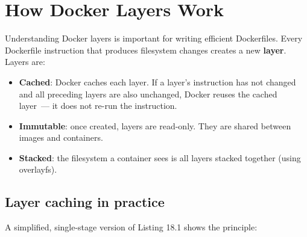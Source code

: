 \setcounter{section}{3}
\section{How Docker Layers Work}\label{18-containerization:184-how-docker-layers-work}

Understanding Docker layers is important for writing efficient Dockerfiles. Every Dockerfile instruction that produces filesystem changes creates a new \textbf{layer}. Layers are:

\begin{itemize}
\tightlist
\item
  \textbf{Cached}: Docker caches each layer. If a layer's instruction has not changed and all preceding layers are also unchanged, Docker reuses the cached layer~--- it does not re-run the instruction.
\item
  \textbf{Immutable}: once created, layers are read-only. They are shared between images and containers.
\item
  \textbf{Stacked}: the filesystem a container sees is all layers stacked together (using overlayfs).
\end{itemize}

\subsection*{Layer caching in practice}\label{18-containerization:layer-caching-in-practice}

A simplified, single-stage version of Listing 18.1 shows the principle:

\begin{codebox}[short]

\begin{Shaded}
\begin{Highlighting}[]

   


 

\end{Highlighting}
\end{Shaded}

\end{codebox}

